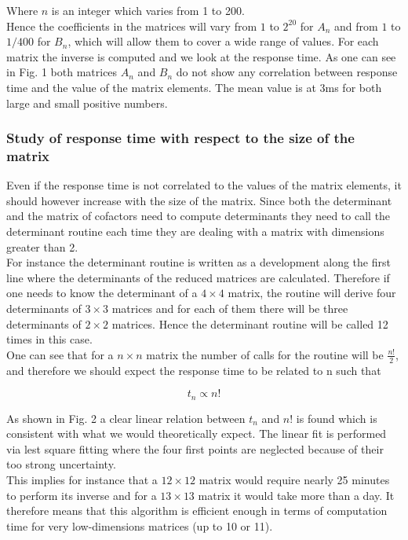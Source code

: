 \documentclass[10 pt]{article}
\begin{document}
\begin{multicols}{2}
Where $n$ is an integer which varies from 1 to 200.\\ Hence the coefficients in the matrices will vary from $1$ to $2^{20}$ for $A_n$ and from $1$ to $1/400$ for $B_n$, which will allow them to cover a wide range of values. For each matrix the inverse is computed and we look at the response time. As one can see in Fig. 1 both matrices $A_n$ and $B_n$ do not show any correlation between response time and the value of the matrix elements. The mean value is at 3ms for both large and small positive numbers.

\subsubsection{Study of response time with respect to the size of the matrix}
Even if the response time is not correlated to the values of the matrix elements, it should however increase with the size of the matrix. Since both the determinant and the matrix of cofactors need to compute determinants they need to call the determinant routine each time they are dealing with a matrix with dimensions greater than 2.\\
For instance the determinant routine is written as a development along the first line where the determinants of the reduced matrices are calculated. Therefore if one needs to know the determinant of a $4\times 4$ matrix, the routine will derive four determinants of $3\times 3$ matrices and for each of them there will be three determinants of $2\times 2$ matrices. Hence the determinant routine will be called 12 times in this case.\\
One can see that for a $n\times n$ matrix the number of calls for the routine will be $\frac{n!}{2}$, and therefore we should expect the response time to be related to n such that

\begin{equation}
t_n \propto n!
\end{equation}

As shown in Fig. 2 a clear linear relation between $t_n$ and $n!$ is found which is consistent with what we would theoretically expect. The linear fit is performed via lest square fitting where the four first points are neglected because of their too strong uncertainty. \\
This implies for instance that a $12\times 12$ matrix would require nearly 25 minutes to perform its inverse and for a $13 \times 13$ matrix it would take more than a day. It therefore means that this algorithm is efficient enough in terms of computation time for very low-dimensions matrices (up to 10 or 11).


\end{multicols}
\end{document}
